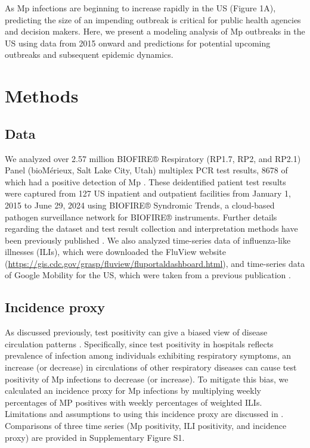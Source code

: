 \documentclass[12pt]{article}
\begin{document}
As Mp infections are beginning to increase rapidly in the US (Figure 1A), predicting the size of an impending outbreak is critical for public health agencies and decision makers.
Here, we present a modeling analysis of Mp outbreaks in the US using data from 2015 onward and predictions for potential upcoming outbreaks and subsequent epidemic dynamics.

\section{Methods}

\subsection{Data}

We analyzed over 2.57 million BIOFIRE® Respiratory (RP1.7, RP2, and RP2.1) Panel (bioMérieux, Salt Lake City, Utah) multiplex PCR test results, 8678 of which had a positive detection of Mp \citep{poritz2011filmarray,leber2018multicenter,creager2020clinical}. 
These deidentified patient test results were captured from 127 US inpatient and outpatient facilities from January 1, 2015 to June 29, 2024 using BIOFIRE® Syndromic Trends, a cloud-based pathogen surveillance network for BIOFIRE® instruments. Further details regarding the dataset and test result collection and interpretation methods have been previously published \citep{meyers2018automated}.
We also analyzed time-series data of influenza-like illnesses (ILIs), which were downloaded the FluView website (\url{https://gis.cdc.gov/grasp/fluview/fluportaldashboard.html}), and time-series data of Google Mobility for the US, which were taken from a previous publication \citep{park2024predicting}.

\subsection{Incidence proxy}

As discussed previously, test positivity can give a biased view of disease circulation patterns \citep{goldstein2011predicting,kissler2020projecting,park2024predicting}. 
Specifically, since test positivity in hospitals reflects prevalence of infection among individuals exhibiting respiratory symptoms, an increase (or decrease) in circulations of other respiratory diseases can cause test positivity of Mp infections to decrease (or increase).
To mitigate this bias, we calculated an incidence proxy for Mp infections by multiplying weekly percentages of MP positives with weekly percentages of weighted ILIs.
Limitations and assumptions to using this incidence proxy are discussed in \cite{goldstein2011predicting}.
Comparisons of three time series (Mp positivity, ILI positivity, and incidence proxy) are provided in Supplementary Figure S1. 
\end{document}

